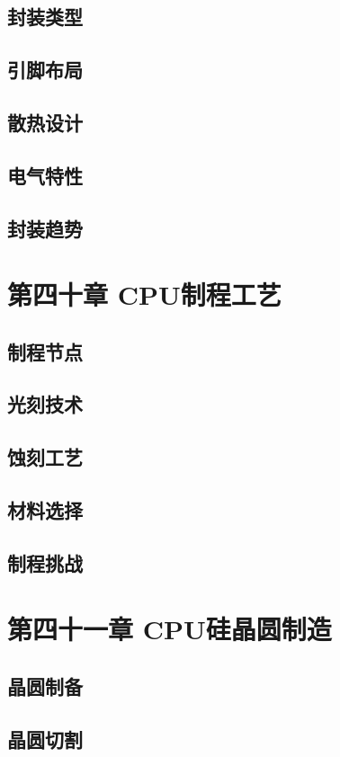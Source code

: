 \documentclass[12pt,UTF8]{ctexbook}
\begin{document}
\section{封装类型}
\section{引脚布局}
\section{散热设计}
\section{电气特性}
\section{封装趋势}

\chapter{第四十章 CPU制程工艺}

\section{制程节点}
\section{光刻技术}
\section{蚀刻工艺}
\section{材料选择}
\section{制程挑战}

\chapter{第四十一章 CPU硅晶圆制造}

\section{晶圆制备}
\section{晶圆切割}
\end{document}
